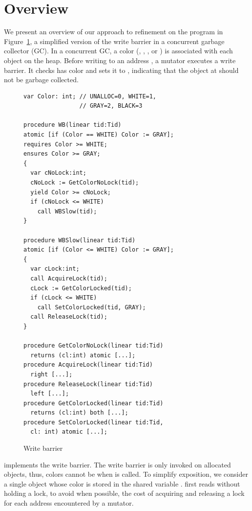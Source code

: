 \section{Overview}
\label{sec:overview}

We present an overview of our approach to refinement on the program in Figure~\ref{fig:reft}, a simplified version of the write barrier in a concurrent garbage collector (GC).
In a concurrent GC, a color (, , , or ) is associated with each object on the heap.  
Before writing to an address , a mutator executes a write barrier. 
It checks  has color  and sets it to , indicating that the object at  should not be garbage collected.
\begin{figure}
\vspace*{-1cm}
{\scriptsize
\begin{verbatim}
var Color: int; // UNALLOC=0, WHITE=1,
                // GRAY=2, BLACK=3

procedure WB(linear tid:Tid)
atomic [if (Color == WHITE) Color := GRAY];
requires Color >= WHITE;
ensures Color >= GRAY;
{
  var cNoLock:int;
  cNoLock := GetColorNoLock(tid);
  yield Color >= cNoLock;
  if (cNoLock <= WHITE) 
    call WBSlow(tid);
}

procedure WBSlow(linear tid:Tid)
atomic [if (Color <= WHITE) Color := GRAY];
{
  var cLock:int;
  call AcquireLock(tid);
  cLock := GetColorLocked(tid);
  if (cLock <= WHITE) 
    call SetColorLocked(tid, GRAY);
  call ReleaseLock(tid);
}

procedure GetColorNoLock(linear tid:Tid) 
  returns (cl:int) atomic [...];
procedure AcquireLock(linear tid:Tid) 
  right [...];
procedure ReleaseLock(linear tid:Tid) 
  left [...];
procedure GetColorLocked(linear tid:Tid) 
  returns (cl:int) both [...];
procedure SetColorLocked(linear tid:Tid, 
  cl: int) atomic [...];
\end{verbatim}
}
\vspace*{-0.3cm}
\caption{Write barrier}
\label{fig:reft}
\end{figure}
 implements the write barrier.
The write barrier is only invoked on allocated objects, thus, colors cannot be  when  is called.
To simplify exposition, we consider a single object whose color is stored in the shared variable . 
 first reads  without holding a lock, to avoid when possible, the cost of acquiring and releasing a lock for each address encountered by a mutator. 
